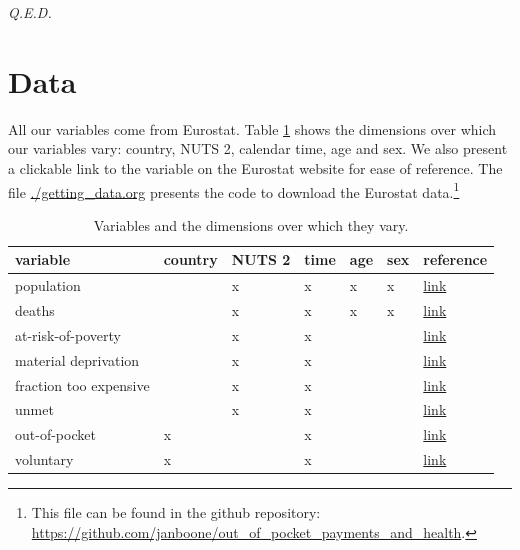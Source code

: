 \documentclass[a4paper,12pt]{article}
\newcommand{\qed}{\hspace*{\fill} {\em Q.E.D.}}
\begin{document}
 \qed


\section{Data}
\label{sec:orga406a86}

All our variables come from Eurostat. Table \ref{tab:VariablesDimensions} shows the dimensions over which our variables vary: country, NUTS 2, calendar time, age and sex. We also present a clickable link to the variable on the Eurostat website for ease of reference. The file \url{./getting\_data.org} presents the code to download the Eurostat data.\footnote{This file can be found in the github repository: \url{https://github.com/janboone/out\_of\_pocket\_payments\_and\_health}.}


\begin{table}[htbp]
\caption{\label{tab:VariablesDimensions}Variables and the dimensions over which they vary.}
\centering
\begin{tabular}{lllllll}
variable & country & NUTS 2 & time & age & sex & reference\\[0pt]
\hline
population &  & x & x & x & x & \href{https://ec.europa.eu/eurostat/databrowser/view/DEMO\_R\_D2JAN/default/table?lang=en\&category=demo.demopreg}{link}\\[0pt]
deaths &  & x & x & x & x & \href{https://ec.europa.eu/eurostat/databrowser/view/DEMO\_R\_MAGEC/default/table?lang=en\&category=demo.demomreg}{link}\\[0pt]
at-risk-of-poverty &  & x & x &  &  & \href{https://ec.europa.eu/eurostat/databrowser/view/tgs00103/default/table?lang=en}{link}\\[0pt]
material deprivation &  & x & x &  &  & \href{https://ec.europa.eu/eurostat/databrowser/view/tgs00104/default/table?lang=en}{link}\\[0pt]
fraction too expensive &  & x & x &  &  & \href{https://ec.europa.eu/eurostat/databrowser/view/hlth\_silc\_08\_r/default/table?lang=en}{link}\\[0pt]
unmet &  & x & x &  &  & \href{https://ec.europa.eu/eurostat/databrowser/view/hlth\_silc\_08\_r/default/table?lang=en}{link}\\[0pt]
out-of-pocket & x &  & x &  &  & \href{https://ec.europa.eu/eurostat/databrowser/view/hlth\_sha11\_hf/default/table?lang=en}{link}\\[0pt]
voluntary & x &  & x &  &  & \href{https://ec.europa.eu/eurostat/databrowser/view/hlth\_sha11\_hf/default/table?lang=en}{link}\\[0pt]

\end{tabular}
\end{table}
\end{document}
